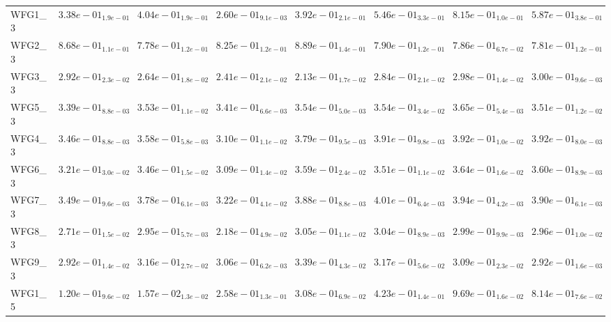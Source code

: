 \documentclass{article}
\begin{document}
\begin{landscape}
\begin{table}
\begin{scriptsize}
\begin{tabular}{llllllll}
WFG1\_3 & $  3.38e-01_{ 1.9e-01}$ & $  4.04e-01_{ 1.9e-01}$ & $  2.60e-01_{ 9.1e-03}$ & $  3.92e-01_{ 2.1e-01}$ & $  5.46e-01_{ 3.3e-01}$ & \cellcolor{gray95}$  8.15e-01_{ 1.0e-01}$ & \cellcolor{gray25}$  5.87e-01_{ 3.8e-01}$ \\
WFG2\_3 & \cellcolor{gray25}$  8.68e-01_{ 1.1e-01}$ & $  7.78e-01_{ 1.2e-01}$ & $  8.25e-01_{ 1.2e-01}$ & \cellcolor{gray95}$  8.89e-01_{ 1.4e-01}$ & $  7.90e-01_{ 1.2e-01}$ & $  7.86e-01_{ 6.7e-02}$ & $  7.81e-01_{ 1.2e-01}$ \\
WFG3\_3 & $  2.92e-01_{ 2.3e-02}$ & $  2.64e-01_{ 1.8e-02}$ & $  2.41e-01_{ 2.1e-02}$ & $  2.13e-01_{ 1.7e-02}$ & $  2.84e-01_{ 2.1e-02}$ & \cellcolor{gray25}$  2.98e-01_{ 1.4e-02}$ & \cellcolor{gray95}$  3.00e-01_{ 9.6e-03}$ \\
WFG5\_3 & $  3.39e-01_{ 8.8e-03}$ & $  3.53e-01_{ 1.1e-02}$ & $  3.41e-01_{ 6.6e-03}$ & $  3.54e-01_{ 5.0e-03}$ & \cellcolor{gray25}$  3.54e-01_{ 3.4e-02}$ & \cellcolor{gray95}$  3.65e-01_{ 5.4e-03}$ & $  3.51e-01_{ 1.2e-02}$ \\
WFG4\_3 & $  3.46e-01_{ 8.8e-03}$ & $  3.58e-01_{ 5.8e-03}$ & $  3.10e-01_{ 1.1e-02}$ & $  3.79e-01_{ 9.5e-03}$ & $  3.91e-01_{ 9.8e-03}$ & \cellcolor{gray95}$  3.92e-01_{ 1.0e-02}$ & \cellcolor{gray25}$  3.92e-01_{ 8.0e-03}$ \\
WFG6\_3 & $  3.21e-01_{ 3.0e-02}$ & $  3.46e-01_{ 1.5e-02}$ & $  3.09e-01_{ 1.4e-02}$ & $  3.59e-01_{ 2.4e-02}$ & $  3.51e-01_{ 1.1e-02}$ & \cellcolor{gray95}$  3.64e-01_{ 1.6e-02}$ & \cellcolor{gray25}$  3.60e-01_{ 8.9e-03}$ \\
WFG7\_3 & $  3.49e-01_{ 9.6e-03}$ & $  3.78e-01_{ 6.1e-03}$ & $  3.22e-01_{ 4.1e-02}$ & $  3.88e-01_{ 8.8e-03}$ & \cellcolor{gray95}$  4.01e-01_{ 6.4e-03}$ & \cellcolor{gray25}$  3.94e-01_{ 4.2e-03}$ & $  3.90e-01_{ 6.1e-03}$ \\
WFG8\_3 & $  2.71e-01_{ 1.5e-02}$ & $  2.95e-01_{ 5.7e-03}$ & $  2.18e-01_{ 4.9e-02}$ & \cellcolor{gray95}$  3.05e-01_{ 1.1e-02}$ & \cellcolor{gray25}$  3.04e-01_{ 8.9e-03}$ & $  2.99e-01_{ 9.9e-03}$ & $  2.96e-01_{ 1.0e-02}$ \\
WFG9\_3 & $  2.92e-01_{ 1.4e-02}$ & $  3.16e-01_{ 2.7e-02}$ & $  3.06e-01_{ 6.2e-03}$ & \cellcolor{gray95}$  3.39e-01_{ 4.3e-02}$ & \cellcolor{gray25}$  3.17e-01_{ 5.6e-02}$ & $  3.09e-01_{ 2.3e-02}$ & $  2.92e-01_{ 1.6e-03}$ \\
WFG1\_5 & $  1.20e-01_{ 9.6e-02}$ & $  1.57e-02_{ 1.3e-02}$ & $  2.58e-01_{ 1.3e-01}$ & $  3.08e-01_{ 6.9e-02}$ & $  4.23e-01_{ 1.4e-01}$ & \cellcolor{gray95}$  9.69e-01_{ 1.6e-02}$ & \cellcolor{gray25}$  8.14e-01_{ 7.6e-02}$ \\

\end{tabular}
\end{scriptsize}
\end{table}
\end{landscape}
\end{document}

